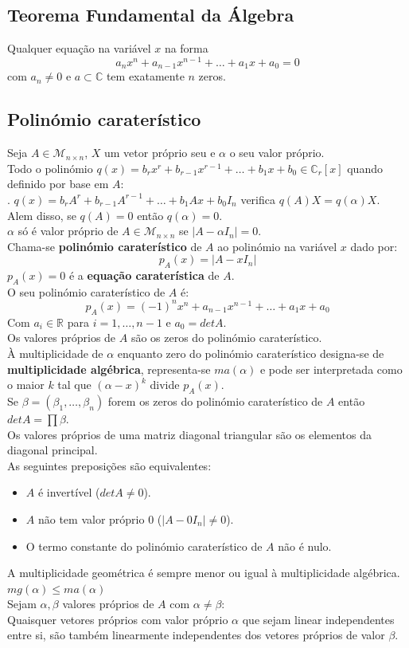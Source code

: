 \documentclass[]{report}
\begin{document}
\subsection{Teorema Fundamental da Álgebra}
Qualquer equação na variável $x$ na forma
$$a_n x^n + a_{n-1} x^{n-1} + \dots + a_1 x + a_0 = 0$$
com $a_n \neq 0$ e $a \subset \mathbb{C}$ tem exatamente $n$ zeros.
\subsection{Polinómio caraterístico}
Seja $A\in \mathcal{M}_{n \times n}$, $X$ um vetor próprio seu e $\alpha$ o seu valor próprio.\\[5mm]
Todo o polinómio  $q(x) = b_r x^r + b_{r-1} x^{r-1} + \dots + b_1 x + b_0 \in \mathbb{C}_r[x]$ quando definido por base em $A$:\\
.\hspace{25mm} $q(x) = b_r A^r + b_{r-1} A^{r-1} + \dots + b_1 A x + b_0 I_n$ verifica $q(A)X = q(\alpha)X$.\\
Alem disso, se $q(A) = 0$ então $q(\alpha) = 0$.\\[2mm]
$\alpha$ só é valor próprio de $A \in \mathcal{M}_{n \times n}$ se $|A - \alpha I_n| = 0$.\\
Chama-se \textbf{polinómio caraterístico} de $A$ ao polinómio na variável $x$ dado por:
$$p_A(x) = |A - x I_n|$$
$p_A(x) = 0$ é a \textbf{equação caraterística} de $A$.\\
O seu polinómio caraterístico de $A$ é:
$$p_A(x) = (-1)^n x^n + a_{n-1} x ^{n-1} + \dots + a_1 x + a_0$$
Com $a_i \in \mathbb{R}$ para $i=1, \dots , n-1$ e $a_0 = det A$.\\
Os valores próprios de $A$ são os zeros do polinómio caraterístico.\\[2mm]
À multiplicidade de $\alpha$ enquanto zero do polinómio caraterístico designa-se de \textbf{multiplicidade algébrica}, representa-se $ma(\alpha)$ e  pode ser interpretada como o maior $k$ tal que $(\alpha - x)^k$ divide $p_A(x)$.\\[2mm]
Se $\beta = (\beta_1, \dots, \beta_n)$ forem os zeros do polinómio caraterístico de $A$ então $det A = \prod \beta$.\\[2mm]
Os valores próprios de uma matriz diagonal triangular são os elementos da diagonal principal.\\[2mm]
As seguintes preposições são equivalentes:
\begin{itemize}
\item $A$ é invertível ($det A \neq 0$).
\item $A$ não tem valor próprio $0$ ($|A - 0 I_n| \neq 0$).
\item O termo constante do polinómio caraterístico de $A$ não é nulo.
\end{itemize}
A multiplicidade geométrica é sempre menor ou igual à multiplicidade algébrica. $mg(\alpha) \leq ma(\alpha)$\\[2mm]
Sejam $\alpha, \beta$ valores próprios de $A$ com $\alpha \neq \beta$:\\
Quaisquer vetores próprios com valor próprio $\alpha$ que sejam linear independentes entre si, são também linearmente independentes dos vetores próprios de valor $\beta$.
\end{document}
